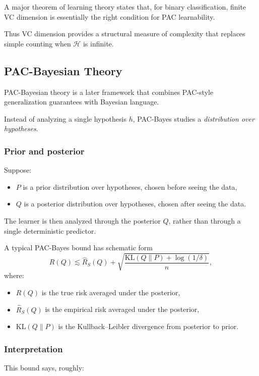 A major theorem of learning theory states that, for binary classification, finite VC dimension is essentially the right condition for PAC learnability.

Thus VC dimension provides a structural measure of complexity that replaces simple counting when \(\mathcal{H}\) is infinite.

\subsection{PAC-Bayesian Theory}

PAC-Bayesian theory is a later framework that combines PAC-style generalization guarantees with Bayesian language.

Instead of analyzing a single hypothesis \(h\), PAC-Bayes studies a \emph{distribution over hypotheses}.

\subsubsection{Prior and posterior}

Suppose:
\begin{itemize}
    \item \(P\) is a prior distribution over hypotheses, chosen before seeing the data,
    \item \(Q\) is a posterior distribution over hypotheses, chosen after seeing the data.
\end{itemize}

The learner is then analyzed through the posterior \(Q\), rather than through a single deterministic predictor.

A typical PAC-Bayes bound has schematic form
\[
R(Q)
\lesssim
\hat{R}_S(Q)
+
\sqrt{\frac{\mathrm{KL}(Q\|P)+\log(1/\delta)}{n}},
\]
where:
\begin{itemize}
    \item \(R(Q)\) is the true risk averaged under the posterior,
    \item \(\hat{R}_S(Q)\) is the empirical risk averaged under the posterior,
    \item \(\mathrm{KL}(Q\|P)\) is the Kullback--Leibler divergence from posterior to prior.
\end{itemize}

\subsubsection{Interpretation}

This bound says, roughly:

